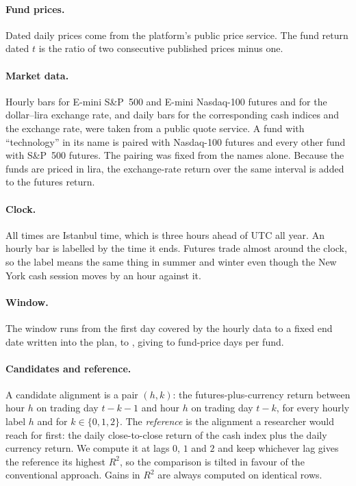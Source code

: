 \documentclass[11pt,a4paper]{article}
\begin{document}
\paragraph{Fund prices.} Dated daily prices come from the platform's public
price service. The fund return dated $t$ is the ratio of two consecutive
published prices minus one.

\paragraph{Market data.} Hourly bars for E-mini S\&P~500 and E-mini
Nasdaq-100 futures and for the dollar--lira exchange rate, and daily bars for
the corresponding cash indices and the exchange rate, were taken from a public
quote service. A fund with ``technology'' in its name is paired with Nasdaq-100
futures and every other fund with S\&P~500 futures. The pairing was fixed from
the names alone. Because the funds are priced in lira, the exchange-rate
return over the same interval is added to the futures return.

\paragraph{Clock.} All times are Istanbul time, which is three hours ahead of
UTC all year. An hourly bar is labelled by the time it ends. Futures trade
almost around the clock, so the label means the same thing in summer and
winter even though the New York cash session moves by an hour against it.

\paragraph{Window.} The window runs from the first day covered by the hourly
data to a fixed end date written into the plan, \WindowFirst{} to
\WindowLast, giving \NDaysMin{} to \NDaysMax{} fund-price days per fund.

\paragraph{Candidates and reference.} A candidate alignment is a pair $(h,k)$:
the futures-plus-currency return between hour $h$ on trading day $t-k-1$ and
hour $h$ on trading day $t-k$, for every hourly label $h$ and for
$k\in\{0,1,2\}$. The \emph{reference} is the alignment a researcher would
reach for first: the daily close-to-close return of the cash index plus the
daily currency return. We compute it at lags $0$, $1$ and $2$ and keep
whichever lag gives the reference its highest $R^{2}$, so the comparison is
tilted in favour of the conventional approach. Gains in $R^{2}$ are always
computed on identical rows.
\end{document}
